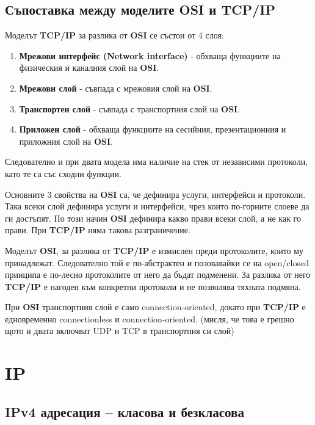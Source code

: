 \documentclass[fleqn,12pt]{article}
\begin{document}
\begin{flushleft}
\subsection{Съпоставка между моделите OSI и TCP/IP}

Моделът \textbf{TCP/IP} за разлика от \textbf{OSI} се състои от 4 слоя:
\begin{enumerate}
    \item \textbf{Мрежови интерфейс (Network interface)} - обхваща функциите на физическия и каналния слой на \textbf{OSI}.
    \item \textbf{Мрежови слой} - съвпада с мрежовия слой на \textbf{OSI}.
    \item \textbf{Транспортен слой} - съвпада с транспортния слой на \textbf{OSI}.
    \item \textbf{Приложен слой} - обхваща функциите на сесийния, презентационния и приложния слой на \textbf{OSI}.
\end{enumerate}

Следователно и при двата модела има наличие на стек от независими протоколи, като те са със сходни функции.

Основните 3 свойства на \textbf{OSI} са, че дефинира услуги, интерфейси и протоколи. Така всеки слой дефинира услуги и интерфейси, чрез които по-горните слоеве да ги достъпят.
По този начин \textbf{OSI} дефинира какво прави всеки слой, а не как го прави. При \textbf{TCP/IP} няма такова разграничение.

Моделът \textbf{OSI}, за разлика от \textbf{TCP/IP} е измислен преди протоколите, които му принадлежат.
Следователно той е по-абстрактен и позовавайки се на open/closed принципа е по-лесно протоколите от него да бъдат подменени.
За разлика от него \textbf{TCP/IP} е нагоден към конкретни протоколи и не позволява тяхната подмяна.

При \textbf{OSI} транспортния слой е само connection-oriented, докато при \textbf{TCP/IP} е едновременно connectionless и connection-oriented. (мисля, че това е грешно щото и двата включват UDP и TCP в транспортния си слой)

\section{IP}

\subsection{IPv4 адресация – класова и безкласова}


\end{flushleft}
\end{document}
